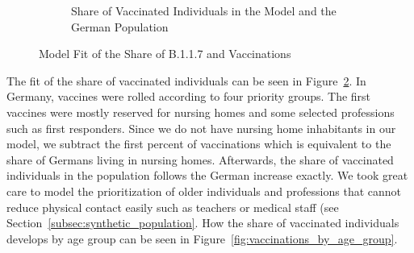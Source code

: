 \begin{figure}[ht]
\begin{subfigure}[b]{0.425\textwidth}
    \caption{Share of Vaccinated Individuals in the Model and the German Population}
    \label{fig:fit_vaccinations}
  \end{subfigure}
  \caption{Model Fit of the Share of B.1.1.7 and Vaccinations}
\end{figure}

The fit of the share of vaccinated individuals can be seen in
Figure~\ref{fig:fit_vaccinations}. In Germany, vaccines were rolled according to four
priority groups. The first vaccines were mostly reserved for nursing homes and some
selected professions such as first responders. Since we do not have nursing home
inhabitants in our model, we subtract the first percent of vaccinations which is
equivalent to the share of Germans living in nursing homes. Afterwards, the share of
vaccinated individuals in the population follows the German increase exactly. We took
great care to model the prioritization of older individuals and professions that cannot
reduce physical contact easily such as teachers or medical staff (see
Section~\ref{subsec:synthetic_population}. How the share of vaccinated individuals
develops by age group can be seen in Figure~\ref{fig:vaccinations_by_age_group}.

\FloatBarrier

